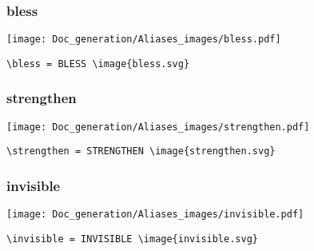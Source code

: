 \documentclass{article}
\begin{document}
\subsubsection{bless}
\begin{minipage}{0.45\linewidth}
\raggedright
\begin{spverbatim}
\bless
\end{spverbatim}
\end{minipage}
\begin{minipage}{0.45\linewidth}
\raggedleft
\texttt{[image: Doc\_generation/Aliases\_images/bless.pdf]}
\end{minipage}
\begin{center}
\begin{BVerbatim}
\bless = BLESS \image{bless.svg}
\end{BVerbatim}
\end{center}

\subsubsection{strengthen}
\begin{minipage}{0.45\linewidth}
\raggedright
\begin{spverbatim}
\strengthen
\end{spverbatim}
\end{minipage}
\begin{minipage}{0.45\linewidth}
\raggedleft
\texttt{[image: Doc\_generation/Aliases\_images/strengthen.pdf]}
\end{minipage}
\begin{center}
\begin{BVerbatim}
\strengthen = STRENGTHEN \image{strengthen.svg}
\end{BVerbatim}
\end{center}

\subsubsection{invisible}
\begin{minipage}{0.45\linewidth}
\raggedright
\begin{spverbatim}
\invisible
\end{spverbatim}
\end{minipage}
\begin{minipage}{0.45\linewidth}
\raggedleft
\texttt{[image: Doc\_generation/Aliases\_images/invisible.pdf]}
\end{minipage}
\begin{center}
\begin{BVerbatim}
\invisible = INVISIBLE \image{invisible.svg}
\end{BVerbatim}
\end{center}
\end{document}
